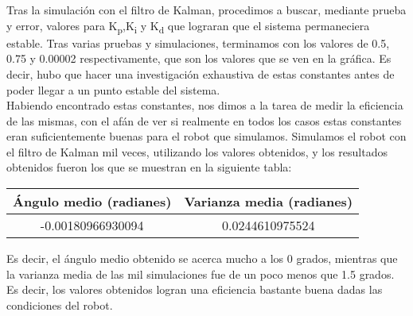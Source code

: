 \documentclass[10pt]{article}
\begin{document}
\begin{center}
\end{center}
Tras la simulación con el filtro de Kalman, procedimos a buscar, mediante prueba y error, valores para  K\textsubscript{p},K\textsubscript{i} y K\textsubscript{d} que lograran que el sistema permaneciera estable. Tras varias pruebas y simulaciones, terminamos con los valores de 0.5, 0.75 y 0.00002 respectivamente, que son los valores que se ven en la gráfica. Es decir, hubo que hacer una investigación exhaustiva de estas constantes antes de poder llegar a un punto estable del sistema.\\
Habiendo encontrado estas constantes, nos dimos a la tarea de medir la eficiencia de las mismas, con el afán de ver si realmente en todos los casos estas constantes eran suficientemente buenas para el robot que simulamos. Simulamos el robot con el filtro de Kalman mil veces, utilizando los valores obtenidos, y los resultados obtenidos fueron los que se muestran en la siguiente tabla:
\begin{center}
\begin{tabular}{| c | c |}       
  \hline              
  Ángulo medio (radianes) & Varianza media (radianes) \\
  \hline
  -0.00180966930094 & 0.0244610975524 \\
  \hline  
\end{tabular}
\end{center}
Es decir, el ángulo medio obtenido se acerca mucho a los 0 grados, mientras que la varianza media de las mil simulaciones fue de un poco menos que 1.5 grados. Es decir, los valores obtenidos logran una eficiencia bastante buena dadas las condiciones del robot. 
\end{document}
